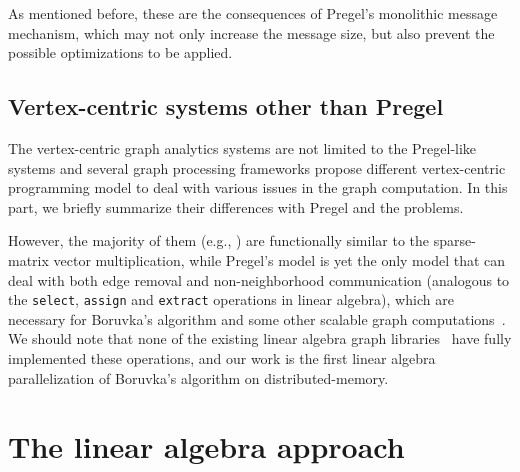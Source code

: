 \documentclass{sokendai_thesis} %
\newcommand{\boruvka}[0]{Boruvka}
\begin{document}
As mentioned before, these are the consequences of Pregel's monolithic message mechanism, which may not only increase the message size, but also prevent the possible optimizations to be applied.

\subsection{Vertex-centric systems other than Pregel}

The vertex-centric graph analytics systems are not limited to the Pregel-like systems and several graph processing frameworks propose different vertex-centric programming model to deal with various issues in the graph computation. 
In this part, we briefly summarize their differences with Pregel and the problems.

However, the majority of them (e.g., \cite{low2012distributed,powergraph,powerlyra,graphmat,gemini,dathathri2018gluon}) are functionally similar to the sparse-matrix vector multiplication, while Pregel's model is yet the only model that can deal with both edge removal and non-neighborhood communication (analogous to the \texttt{select}, \texttt{assign} and \texttt{extract} operations in linear algebra), which are necessary for \boruvka{}'s algorithm and some other scalable graph computations~\cite{fastsv,lacc,salihoglu2014help}.
We should note that none of the existing linear algebra graph libraries~\cite{combblas,graphpad,graphmat} have fully implemented these operations, and our work is the first linear algebra parallelization of \boruvka{}'s algorithm on distributed-memory.



\section{The linear algebra approach}

\end{document}
